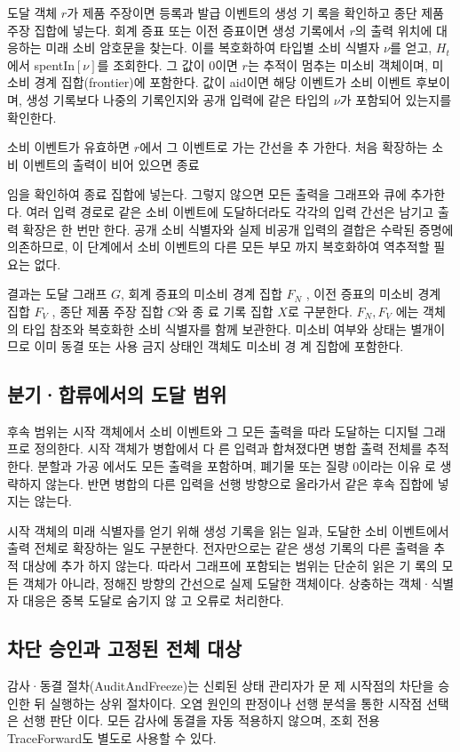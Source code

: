 도달 객체 \(r\)가 제품 주장이면 등록과 발급 이벤트의 생성 기
록을 확인하고 종단 제품 주장 집합에 넣는다. 회계 증표 또는
이전 증표이면 생성 기록에서 \(r\)의 출력 위치에 대응하는 미래
소비 암호문을 찾는다. 이를 복호화하여 타입별 소비 식별자
\(ν\)를 얻고, \(H_{t}\)에서 spentIn\([ν]\)를 조회한다. 그 값이 0이면 \(r\)는
추적이 멈추는 미소비 객체이며, 미소비 경계 집합(frontier)에
포함한다. 값이 aid이면 해당 이벤트가 소비 이벤트 후보이며,
생성 기록보다 나중의 기록인지와 공개 입력에 같은 타입의 \(ν\)가
포함되어 있는지를 확인한다.

소비 이벤트가 유효하면 \(r\)에서 그 이벤트로 가는 간선을 추
가한다. 처음 확장하는 소비 이벤트의 출력이 비어 있으면 종료

임을 확인하여 종료 집합에 넣는다. 그렇지 않으면 모든 출력을
그래프와 큐에 추가한다. 여러 입력 경로로 같은 소비 이벤트에
도달하더라도 각각의 입력 간선은 남기고 출력 확장은 한 번만
한다. 공개 소비 식별자와 실제 비공개 입력의 결합은 수락된
증명에 의존하므로, 이 단계에서 소비 이벤트의 다른 모든 부모
까지 복호화하여 역추적할 필요는 없다.

결과는 도달 그래프 \(G\), 회계 증표의 미소비 경계 집합 \(F_{N}\) ,
이전 증표의 미소비 경계 집합 \(F_{V}\) , 종단 제품 주장 집합 \(C\)와 종
료 기록 집합 \(X\)로 구분한다. \(F_{N},F_{V}\) 에는 객체의 타입 참조와
복호화한 소비 식별자를 함께 보관한다. 미소비 여부와 상태는
별개이므로 이미 동결 또는 사용 금지 상태인 객체도 미소비 경
계 집합에 포함한다.

\subsection{분기·합류에서의 도달 범위}
후속 범위는 시작 객체에서 소비 이벤트와 그 모든 출력을 따라
도달하는 디지털 그래프로 정의한다. 시작 객체가 병합에서 다
른 입력과 합쳐졌다면 병합 출력 전체를 추적한다. 분할과 가공
에서도 모든 출력을 포함하며, 폐기물 또는 질량 0이라는 이유
로 생략하지 않는다. 반면 병합의 다른 입력을 선행 방향으로
올라가서 같은 후속 집합에 넣지는 않는다.

시작 객체의 미래 식별자를 얻기 위해 생성 기록을 읽는 일과,
도달한 소비 이벤트에서 출력 전체로 확장하는 일도 구분한다.
전자만으로는 같은 생성 기록의 다른 출력을 추적 대상에 추가
하지 않는다. 따라서 그래프에 포함되는 범위는 단순히 읽은 기
록의 모든 객체가 아니라, 정해진 방향의 간선으로 실제 도달한
객체이다. 상충하는 객체·식별자 대응은 중복 도달로 숨기지 않
고 오류로 처리한다.

\subsection{차단 승인과 고정된 전체 대상}
감사·동결 절차(AuditAndFreeze)는 신뢰된 상태 관리자가 문
제 시작점의 차단을 승인한 뒤 실행하는 상위 절차이다. 오염
원인의 판정이나 선행 분석을 통한 시작점 선택은 선행 판단
이다. 모든 감사에 동결을 자동 적용하지 않으며, 조회 전용
TraceForward도 별도로 사용할 수 있다.

